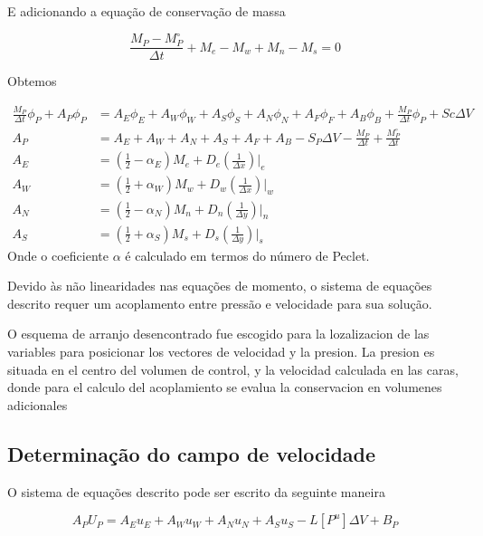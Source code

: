 \documentclass[]{article}
\begin{document}
E adicionando a equação de conservação de massa

\begin{equation}
	\frac{M_P - M_P^\circ}{\Delta t} + M_e - M_w + M_n - M_s = 0
\end{equation}

Obtemos

\begin{equation}
	\begin{aligned}
		\frac{M_P}{\Delta t} \phi_P + A_P \phi_P &= A_E \phi_E + A_W \phi_W + A_S \phi_S + A_N \phi_N + A_F \phi_F + A_B \phi_B + \frac{M_P}{\Delta t} \phi_P + Sc \Delta V \\
		A_P &= A_E + A_W + A_N + A_S + A_F + A_B - S_P \Delta V - \frac{M_P}{\Delta t} + \frac{M_P^\circ}{\Delta t} \\
		A_E &= \left( \frac{1}{2} - \alpha_E \right) M_e + D_e  \left( \frac{1}{\Delta x} \right) |_e \\
		A_W &= \left( \frac{1}{2} + \alpha_W \right) M_w + D_w \left( \frac{1}{\Delta x} \right) |_w \\
		A_N &= \left( \frac{1}{2} - \alpha_N \right) M_n + D_n  \left( \frac{1}{\Delta y} \right) |_n \\
		A_S &= \left( \frac{1}{2} + \alpha_S \right) M_s + D_s  \left( \frac{1}{\Delta y} \right) |_s
	\end{aligned}
\end{equation}
Onde o coeficiente $\alpha$ é calculado em termos do número de Peclet.

Devido às não linearidades nas equações de momento, o sistema de equações descrito requer um acoplamento entre pressão e velocidade para sua solução.

O esquema de arranjo desencontrado fue escogido para la lozalizacion de las variables para posicionar los vectores de velocidad y la presion. La presion es situada en el centro del volumen de control, y la velocidad calculada en las caras, donde para el calculo del acoplamiento se evalua la conservacion en volumenes adicionales



\subsection*{Determinação do campo de velocidade}
O sistema de equações descrito pode ser escrito da seguinte maneira

\begin{equation}
	A_P U_P = A_E u_E + A_W u_W + A_N u_N + A_S u_S - L \left[ P^u \right] \Delta V + B_P
\end{equation}
\end{document}
